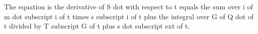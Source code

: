 The equation is the derivative of S dot with respect to t equals the sum over i of m dot subscript i of t times s subscript i of t plus the integral over G of Q dot of t divided by T subscript G of t plus s dot subscript ext of t.